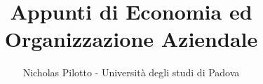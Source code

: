 \documentclass[12pt,a4paper]{article}
\begin{document}
    \author{Nicholas Pilotto - Università degli studi di Padova}
    \title{Appunti di Economia ed Organizzazione Aziendale}

    \maketitle
    \newpage
    \tableofcontents
	\newpage
	
	
\end{document}
